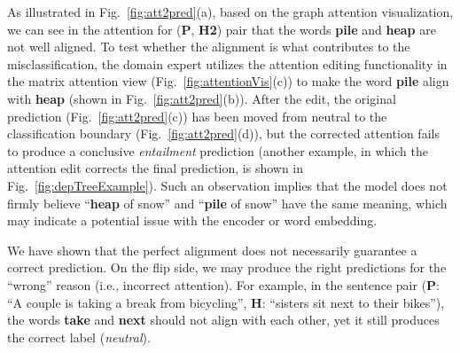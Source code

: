 As illustrated in Fig.~\ref{fig:att2pred}(a), based on the graph attention visualization, we can see in the attention for (\textbf{P}, \textbf{H2}) pair that the words \textbf{pile} and \textbf{heap} are not well aligned.
%
To test whether the alignment is what contributes to the misclassification, the domain expert utilizes the attention editing functionality in the matrix attention view (Fig.~\ref{fig:attentionVis}(c)) to make the word \textbf{pile} align with \textbf{heap} (shown in Fig.~\ref{fig:att2pred}(b)).
%
After the edit, the original prediction (Fig.~\ref{fig:att2pred}(c)) has been moved from neutral to the classification boundary (Fig.~\ref{fig:att2pred}(d)), but the corrected attention fails to produce a conclusive \emph{entailment} prediction (another example, in which the attention edit corrects the final prediction, is shown in Fig.~\ref{fig:depTreeExample}).
%
Such an observation implies that the model does not firmly believe ``\textbf{heap} of snow'' and ``\textbf{pile} of snow'' have the same meaning, which may indicate a potential issue with the encoder or word embedding.




We have shown that the perfect alignment does not necessarily guarantee a correct prediction.
%
On the flip side, we may produce the right predictions for the ``wrong'' reason (i.e., incorrect attention).
For example, in the sentence pair (\textbf{P}: ``A couple is taking a break from bicycling'', \textbf{H}: ``sisters sit next to their bikes''), the words \textbf{take} and \textbf{next} should not align with each other,
yet it still produces the correct label (\emph{neutral}).%

